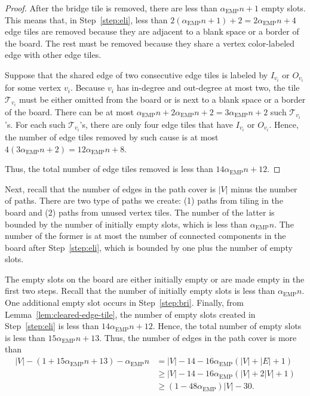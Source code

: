 \documentclass[11pt]{article}
\def\EMP{\mathrm{EMP}}
\begin{document}
\begin{proof}
After the bridge tile is removed, there are less than $\alpha_{\EMP}n + 1$ empty slots. This means that, in Step~\ref{step:eli}, less than $2(\alpha_{\EMP}n + 1) + 2 = 2\alpha_{\EMP}n + 4$ edge tiles are removed because they are adjacent to a blank space or a border of the board. The rest must be removed because they share a vertex color-labeled edge with other edge tiles.

Suppose that the shared edge of two consecutive edge tiles is labeled by $I_{v_i}$ or $O_{v_i}$ for some vertex ${v_i}$. Because $v_i$ has in-degree and out-degree at most two, the tile $\mathcal{T}_{v_i}$ must be either omitted from the board or is next to a blank space or a border of the board. There can be at most $\alpha_{\EMP}n + 2\alpha_{\EMP}n + 2 = 3\alpha_{\EMP}n + 2$ such $\mathcal{T}_{v_i}$'s. For each such $\mathcal{T}_{v_i}$'s, there are only four edge tiles that have $I_{v_i}$ or $O_{v_i}$. Hence, the number of edge tiles removed by such cause is at most $4(3\alpha_{\EMP}n + 2) = 12\alpha_{\EMP}n + 8$.

Thus, the total number of edge tiles removed is less than $14\alpha_{\EMP}n + 12$.
\end{proof}

Next, recall that the number of edges in the path cover is $|V|$ minus the number of paths. There are two type of paths we create: (1) paths from tiling in the board and (2) paths from unused vertex tiles. The number of the latter is bounded by the number of initially empty slots, which is less than $\alpha_{\EMP}n$. The number of the former is at most the number of connected components in the board after Step~\ref{step:eli}, which is bounded by one plus the number of empty slots.

The empty slots on the board are either initially empty or are made empty in the first two steps. Recall that the number of initially empty slots is less than $\alpha_{\EMP}n$. One additional empty slot occurs in Step~\ref{step:bri}. Finally, from Lemma~\ref{lem:cleared-edge-tile}, the number of empty slots created in Step~\ref{step:eli} is less than $14\alpha_{\EMP}n + 12$. Hence, the total number of empty slots is less than $15\alpha_{\EMP}n + 13$. Thus, the number of edges in the path cover is more than
\begin{align*}
|V| - (1 + 15\alpha_{\EMP}n + 13) - \alpha_{\EMP}n
&= |V| - 14 - 16\alpha_{\EMP}(|V| + |E| + 1) \\
&\geq |V| - 14 - 16\alpha_{\EMP}(|V| + 2|V| + 1) \\
&\geq (1 - 48\alpha_{\EMP})|V| - 30.
\end{align*}
\end{document}
